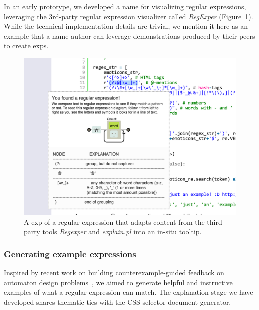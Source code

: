 In an early prototype, we developed a  \Gls{name} for visualizing regular expressions, leveraging the 3rd-party regular expression visualizer called \emph{RegExper} (Figure~\ref{fig:regex_visualization}).
While the technical implementation details are trivial, we mention it here as an example that a \Gls{name} author can leverage demonstrations produced by their peers to create \glspl{exp}.

\begin{figure}
\centering
\includegraphics[width=\columnwidth]{figures/explain_on_select}
\caption{A \gls{exp} of a regular expression that adapts content from the third-party tools \emph{Regexper} and \emph{explain.pl} into an in-situ tooltip.}
\label{fig:regex_visualization}
\end{figure}

\subsubsection{Generating example expressions}

Inspired by recent work on building counterexample-guided feedback on automaton design problems~\cite{dantoni_how_2015}, we aimed to generate helpful and instructive examples of what a regular expression can match.
The explanation stage we have developed shares thematic ties with the CSS selector document generator. 
\fi

